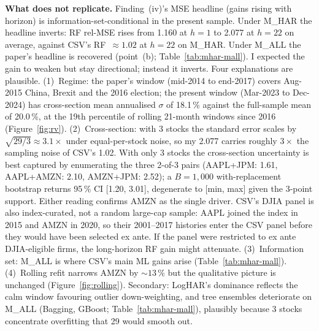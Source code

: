 \documentclass[twocolumn,9pt]{extarticle}
\newcommand{\lead}[1]{\textbf{#1}\hspace{0.25em}\ignorespaces}
\begin{document}
\lead{What does not replicate.} Finding~(iv)'s MSE headline (gains
rising with horizon) is information-set-conditional in the present
sample. Under M\_HAR the headline inverts: RF rel-MSE rises from
1.160 at $h=1$ to 2.077 at $h=22$ on average, against CSV's
RF~$\approx1.02$ at $h=22$ on M\_HAR. Under M\_ALL the paper's
headline is recovered (point~(b); Table~\ref{tab:mhar-mall}). I expected the gain to
weaken but stay directional; instead it inverts. Four explanations
are plausible. (1)~Regime: the paper's window (mid-2014 to end-2017)
covers Aug-2015 China, Brexit and the 2016 election; the present
window (Mar-2023 to Dec-2024) has cross-section mean annualised
$\sigma$ of 18.1\,\% against the full-sample mean of 20.0\,\%, at
the 19th percentile of rolling 21-month windows since 2016
(Figure~\ref{fig:rv}). (2)~Cross-section: with 3 stocks the standard error
scales by $\sqrt{29/3}\approx3.1\times$ under equal-per-stock noise,
so my 2.077 carries roughly $3\times$ the sampling noise of CSV's
1.02. With only 3 stocks the cross-section uncertainty is best
captured by enumerating the three 2-of-3 pairs (AAPL+JPM: 1.61,
AAPL+AMZN: 2.10, AMZN+JPM: 2.52); a $B=1{,}000$ with-replacement
bootstrap returns 95\,\% CI [1.20, 3.01], degenerate to [min, max]
given the 3-point support. Either reading confirms AMZN as the
single driver. CSV's DJIA panel is also index-curated, not a random
large-cap sample: AAPL joined the index in 2015 and AMZN in 2020,
so their 2001--2017 histories enter the CSV panel before they would
have been selected ex ante. If the panel were restricted to ex ante
DJIA-eligible firms, the long-horizon RF gain might attenuate.
(3)~Information set: M\_ALL is where CSV's main ML gains arise
(Table~\ref{tab:mhar-mall}). (4)~Rolling refit narrows AMZN by $\sim13\,\%$ but the
qualitative picture is unchanged (Figure~\ref{fig:rolling}). Secondary: LogHAR's
dominance reflects the calm window favouring outlier
down-weighting, and tree ensembles deteriorate on M\_ALL (Bagging,
GBoost; Table~\ref{tab:mhar-mall}), plausibly because 3 stocks concentrate
overfitting that 29 would smooth out.
\end{document}

